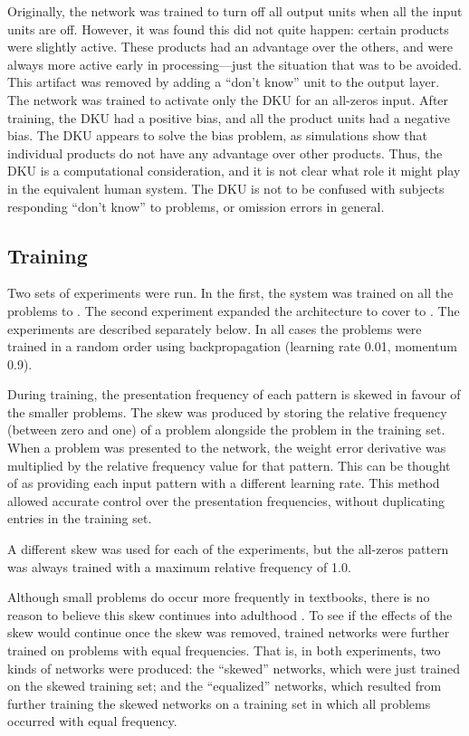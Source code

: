 Originally, the network was trained to turn off all output units when all
the input units are off.  However, it was found this did not quite happen:
certain products were slightly active. These products had an advantage over
the others, and were always more active early in processing---just the
situation that was to be avoided.  This artifact was removed by adding a
``don't know'' unit to the output layer. The network was trained to 
activate only the DKU for an all-zeros input. After training, the DKU had a
positive bias, and all the product units had a negative bias.  The DKU
appears to solve the bias problem, as simulations show that individual
products do not have any advantage over other products. Thus, the DKU is a
computational consideration, and it is not clear what role it might play in
the equivalent human system.  The DKU is not to be confused with subjects
responding ``don't know'' to problems, or omission errors in general.

\subsection{Training}

Two sets of experiments were run.  In the first, the system was trained on
all the problems  to .  The second experiment expanded the
architecture
to
cover  to .  The experiments are described separately below.  In
all cases the problems were trained in a random order using backpropagation
(learning rate 0.01, momentum 0.9).

During training, the presentation frequency of each pattern is skewed in
favour of the smaller problems.
The skew was produced by storing the relative frequency (between zero and
one) of a problem alongside the problem in the training set.  When a
problem was presented to the network, the weight error derivative was
multiplied by the relative frequency value for that pattern. This can be
thought of as providing each input pattern with a different
learning rate. This method allowed accurate control over the presentation
frequencies, without duplicating entries in the training set.

A different skew was used for each of the experiments, but the all-zeros
pattern was always trained with a maximum relative frequency of 1.0.

Although small problems do occur more frequently in textbooks, there is no
reason to believe this skew continues into adulthood
\cite[p.~328]{mcclmode}. To see if the effects of the skew would continue
once the skew was removed, trained networks were further trained on
problems with equal frequencies. That is, in both experiments, two kinds of
networks were produced:  the ``skewed'' networks, which were just trained
on the skewed training set; and the ``equalized'' networks, which resulted
from further training the skewed networks on a training set in which all
problems occurred with equal frequency.

